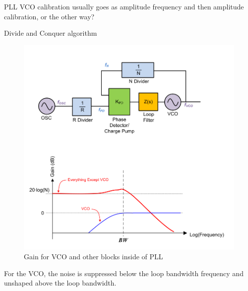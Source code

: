 \documentclass{article}
\begin{document}
PLL VCO calibration usually goes as amplitude frequency and then amplitude calibration, or the other way?

Divide and Conquer algorithm


\begin{figure}[!ht]
	\includegraphics[width=\linewidth]{Figures/PLL_basics_regarding_VCO.png}
	\caption{Gain for VCO and  other blocks inside of PLL}
	\label{fig:PLL_basics_regarding_VCO	}
\end{figure}

\begin{info}
	For the VCO, the noise is suppressed below the loop bandwidth frequency and unshaped above the loop bandwidth.
\end{info}







\end{document}
